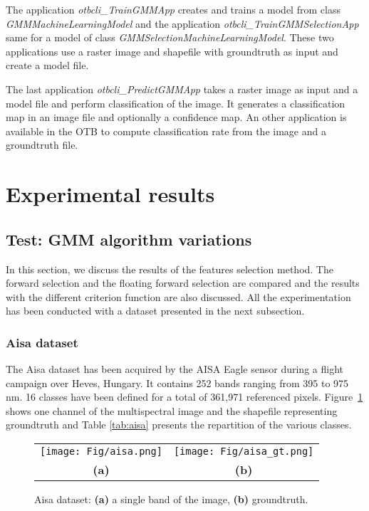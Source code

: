 \documentclass[a4paper,11pt,DIV=16,abstracton]{scrartcl}
\begin{document}
        The application \emph{otbcli\_TrainGMMApp} creates and trains a model from class \emph{GMMMachineLearningModel} and the application \emph{otbcli\_TrainGMMSelectionApp} same for a model of class \emph{GMMSelectionMachineLearningModel}. These two applications use a raster image and shapefile with groundtruth as input and create a model file.

        The last application \emph{otbcli\_PredictGMMApp} takes a raster image as input and a model file and perform classification of the image. It generates a classification map in an image file and optionally a confidence map. An other application is available in the OTB to compute classification rate from the image and a groundtruth file.

\section{Experimental results}
\label{sec:test}

    \subsection{Test: GMM algorithm variations}
    \label{sec:gmm-results}
    In this section, we discuss the results of the features selection method. The forward selection and the floating forward selection are compared and the results with the different criterion function are also discussed. All the experimentation has been conducted with a dataset presented in the next subsection.

        \subsubsection{Aisa dataset}
        \label{sec:aisa}
        The Aisa dataset has been acquired by the AISA Eagle sensor during a flight campaign over Heves, Hungary. It contains 252 bands ranging from 395 to 975 nm. 16 classes have been defined for a total of 361,971 referenced pixels. Figure~\ref{fig:aisa} shows one channel of the multispectral image and the shapefile representing groundtruth and Table \ref{tab:aisa} presents the repartition of the various classes.

        \begin{figure}[!ht]
            \centering
            \begin{tabular}{cc}
                \texttt{[image: Fig/aisa.png]} &
                \texttt{[image: Fig/aisa\_gt.png]} \\
                {\bfseries{(a)}} & {\bfseries{(b)}} \\
            \end{tabular}
            \caption{Aisa dataset: {\bfseries{(a)}} a single band of the image, {\bfseries{(b)}} groundtruth.\label{fig:aisa}}
        \end{figure}
\end{document}
